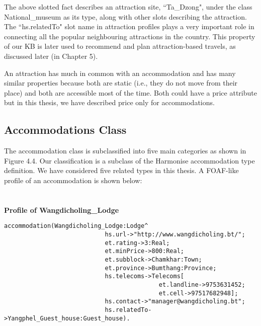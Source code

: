 \hspace{0.3in}The above slotted fact describes an attraction site, ``Ta\_Dzong", under the class National\_museum as its type, along with other slots describing the attraction. The ``hs.relatedTo" slot name in attraction profiles plays a very important role in connecting all the popular neighbouring attractions in the country. This property of our KB is later used to recommend and plan attraction-based travels, as discussed later (in Chapter 5).

\hspace{0.3in}An attraction has much in common with an accommodation and has many similar properties because both are static (i.e., they do not move from their place) and both are accessible most of the time. Both could have a price attribute but in this thesis, we have described price only for accommodations.

\subsection{Accommodations Class}
 
\hspace{0.3in} The accommodation class is subclassified into five main categories as shown in Figure 4.4. Our classification is a subclass of the Harmonise accommodation type definition. We have considered five related types in this thesis. A FOAF-like profile of an accommodation is shown below:
\\
\\
\\
\textbf{Profile of Wangdicholing\_Lodge}

\begin{small}
\singlespacing
\begin{verbatim} 
accommodation(Wangdicholing_Lodge:Lodge^
                            hs.url->"http://www.wangdicholing.bt/";
                            et.rating->3:Real;
                            et.minPrice->800:Real;
                            et.subblock->Chamkhar:Town;
                            et.province->Bumthang:Province;
                            hs.telecoms->Telecoms[
                                           et.landline->9753631452;
                                           et.cell->97517682948];
                            hs.contact->"manager@wangdicholing.bt";
                            hs.relatedTo->Yangphel_Guest_house:Guest_house).      
\end{verbatim}
\end{small}

